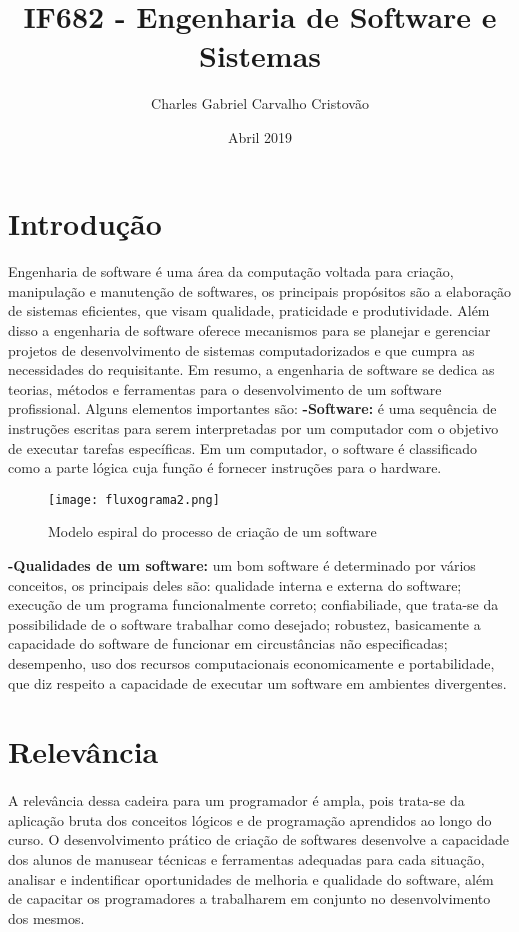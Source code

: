 \documentclass[10pt]{article}
\title{IF682 - Engenharia de Software e Sistemas}
\author{Charles Gabriel Carvalho Cristovão}
\date{Abril 2019}
\begin{document}
\maketitle

\section{Introdução}
\paragraph{}Engenharia de software é uma área da computação voltada para criação, manipulação e manutenção de softwares, os principais propósitos são a elaboração de sistemas eficientes, que visam qualidade, praticidade e produtividade. Além disso a engenharia de software oferece mecanismos para se planejar e gerenciar projetos de desenvolvimento de sistemas computadorizados e que cumpra as necessidades do requisitante. Em resumo, a engenharia de software se dedica as teorias, métodos e ferramentas para o desenvolvimento de um software profissional.\cite{pagina} Alguns elementos importantes são:\newline
\textbf{-Software:} é uma sequência de instruções escritas para serem interpretadas por um computador com o objetivo de executar tarefas específicas. Em um computador, o software é classificado como a parte lógica cuja função é fornecer instruções para o hardware.\citep{slide1}

\begin{figure}[ht]
    \centering
    \texttt{[image: fluxograma2.png]}
    \caption{Modelo espiral do processo de criação de um software}\citep{slide2}
    \label{fig:fluxograma2}
\end{figure}
\newpage
\textbf{-Qualidades de um software:} um bom software é determinado por vários conceitos, os principais deles são: qualidade interna e externa do software; execução de um programa funcionalmente correto; confiabiliade, que trata-se da possibilidade de o software trabalhar como desejado; robustez, basicamente a capacidade do software de funcionar em circustâncias não especificadas; desempenho, uso dos recursos computacionais economicamente e portabilidade, que diz respeito a capacidade de executar um software em ambientes divergentes.\citep{slide3}
\section{Relevância}
\paragraph{}A relevância dessa cadeira para um programador é ampla, pois trata-se da aplicação bruta dos conceitos lógicos e de programação aprendidos ao longo do curso. O desenvolvimento prático de criação de softwares desenvolve a capacidade dos alunos de manusear técnicas e ferramentas adequadas para cada situação, analisar e indentificar oportunidades de melhoria e qualidade do software, além de capacitar os programadores a trabalharem em conjunto no desenvolvimento dos mesmos.
\end{document}
